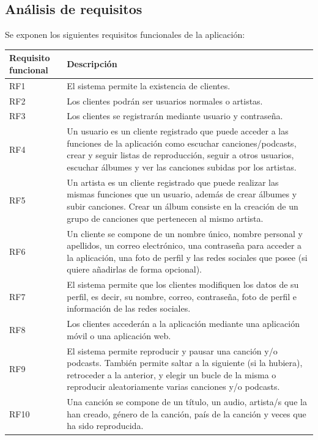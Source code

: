 \documentclass{article}
\begin{document}
\subsection{Análisis de requisitos}
Se exponen los siguientes requisitos funcionales de la aplicación:
\begin{table}[H]
	\begin{tabular}{p{4cm} p{10cm}}
		\hline
		\hline 
		\textbf{Requisito funcional}
		\vspace{0.5mm} & \textbf{Descripción} \\ 
		\hline
		\hline
		RF1
		& El sistema permite la existencia de clientes. \\ 
		\hline 
		RF2
		& Los clientes podrán ser usuarios normales o artistas. \\ 
		\hline
		RF3
		& Los clientes se registrarán mediante usuario y contraseña. \\ 
		\hline
		RF4
		& Un usuario es un cliente registrado que puede acceder a las funciones de la aplicación como escuchar canciones/podcasts, crear y seguir listas de reproducción, seguir a otros usuarios, escuchar álbumes y ver las canciones subidas por los artistas. \\ 
		\hline
		RF5
		& Un artista es un cliente registrado que puede realizar las mismas funciones que un usuario, además de crear álbumes y subir canciones. Crear un álbum consiste en la creación de un grupo de canciones que pertenecen al mismo artista. \\ 
		\hline
		RF6
		& Un cliente se compone de un nombre único, nombre personal y apellidos, un correo electrónico, una contraseña para acceder a la aplicación, una foto de perfil y las redes sociales que posee (si quiere añadirlas de forma opcional). \\ 
		\hline
		RF7
		& El sistema permite que los clientes modifiquen los datos de su perfil, es decir, su nombre, correo, contraseña, foto de perfil e información de las redes sociales. \\ 
		\hline
		RF8
		& Los clientes accederán a la aplicación mediante una aplicación móvil o una aplicación web. \\ 
		\hline
		RF9
		& El sistema permite reproducir y pausar una canción y/o podcasts. También permite saltar a la siguiente (si la hubiera), retroceder a la anterior, y elegir un bucle de la misma o reproducir aleatoriamente varias canciones y/o podcasts. \\ 
		\hline
		RF10
		& Una canción se compone de un título, un audio, artista/s que la han creado, género de la canción, país de la canción y veces que ha sido reproducida. \\ 

\end{tabular}
\end{table}
\end{document}
